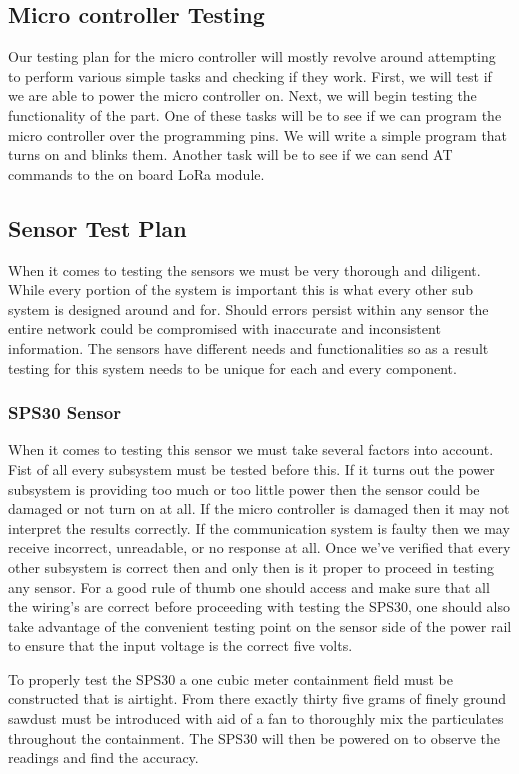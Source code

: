 \subsection{Micro controller Testing}
Our testing plan for the micro controller will mostly revolve around attempting to perform various simple tasks and checking if they work. First, we will test if we are able to power the micro controller on. Next, we will begin testing the functionality of the part. One of these tasks will be to see if we can program the micro controller over the programming pins. We will write a simple program that turns on and blinks them. Another task will be to see if we can send AT commands to the on board LoRa module.

\subsection{Sensor Test Plan}
When it comes to testing the sensors we must be very thorough and diligent. While every portion of the system is important this is what every other sub system is designed around and for. Should errors persist within any sensor the entire network could be compromised with inaccurate and inconsistent information. The sensors have different needs and functionalities so as a result testing for this system needs to be unique for each and every component.

\subsubsection{SPS30 Sensor}
When it comes to testing this sensor we must take several factors into account. Fist of all every subsystem must be tested before this. If it turns out the power subsystem is providing too much or too little power then the sensor could be damaged or not turn on at all. If the micro controller is damaged then it may not interpret the results correctly. If the communication system is faulty then we may receive incorrect, unreadable, or no response at all. Once we've verified that every other subsystem is correct then and only then is it proper to proceed in testing any sensor.
For a good rule of thumb one should access and make sure that all the wiring's are correct before proceeding with testing the SPS30, one should also take advantage of the convenient testing point on the sensor side of the power rail to ensure that the input voltage is the correct five volts.

To properly test the SPS30 a one cubic meter containment field must be constructed that is airtight. From there exactly thirty five grams of finely ground sawdust must be introduced with aid of a fan to thoroughly mix the particulates throughout the containment. The SPS30 will then be powered on to observe the readings and find the accuracy.

